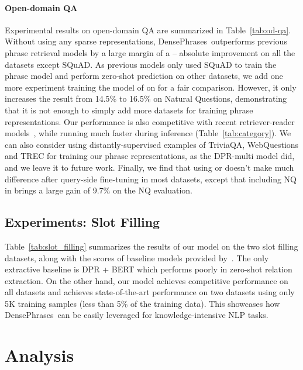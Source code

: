 \documentclass[11pt,a4paper]{article}
\newcommand{\ours}{DensePhrases}
\begin{document}
\paragraph{Open-domain QA}
Experimental results on open-domain QA are summarized in Table~\ref{tab:od-qa}.
Without using any sparse representations, \ours~outperforms previous phrase retrieval models by a large margin of a -- absolute improvement on all the datasets except SQuAD. As previous models only used SQuAD to train the phrase model and perform zero-shot prediction on other datasets, we add one more experiment training the model of  on  for a fair comparison. However, it only increases the result from 14.5\% to 16.5\% on Natural Questions, demonstrating that it is not enough to simply add more datasets for training phrase representations. Our performance is also competitive with recent retriever-reader models~\cite{karpukhin2020dense,guu2020realm}, while running much faster during inference (Table~\ref{tab:category}). We can also consider using distantly-supervised examples of TriviaQA, WebQuestions and TREC for training our phrase representations, as the DPR-multi model did, and we leave it to future work. Finally, we find that using  or  doesn't make much difference after query-side fine-tuning in most datasets, except that including NQ in  brings a large gain of 9.7\% on the NQ evaluation.









\subsection{Experiments: Slot Filling}\label{sec:slot_filling}

Table~\ref{tab:slot_filling} summarizes the results of our model on the two slot filling datasets, along with the scores of baseline models provided by~\citet{petroni2020kilt}.
The only extractive baseline is DPR + BERT which performs poorly in zero-shot relation extraction.
On the other hand, our model achieves competitive performance on all datasets and achieves state-of-the-art performance on two datasets using only 5K training samples (less than 5\% of the training data).
This showcases how \ours~can be easily leveraged for knowledge-intensive NLP tasks.

 

\section{Analysis}
\label{sec:analysis}
\end{document}
